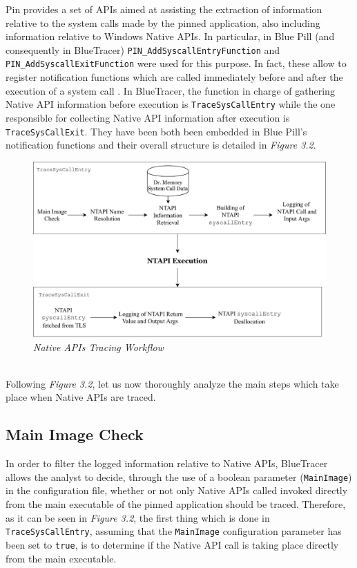 Pin provides a set of APIs aimed at assisting the extraction of information relative to the system calls made by the pinned application, also including information relative to Windows Native APIs. In particular, in Blue Pill (and consequently in BlueTracer) \texttt{PIN\_AddSyscallEntryFunction} and  \texttt{PIN\_AddSyscallExitFunction} were used for this purpose. In fact, these allow to register notification functions which are called immediately before and after the execution of a system call \cite{Pin}. In BlueTracer, the function in charge of gathering Native API information before execution is \texttt{TraceSysCallEntry} while the one responsible for collecting Native API information after execution is \texttt{TraceSysCallExit}. They have been both been embedded in Blue Pill's notification functions and their overall structure is detailed in \textit{Figure 3.2}.
\\
\begin{figure}[h]
\centering
\includegraphics[scale=0.75]{Figures/NTAPITracing.pdf}
\caption{\textit{Native APIs Tracing Workflow}}
\end{figure}
\\
Following \textit{Figure 3.2}, let us now thoroughly analyze the main steps which take place when Native APIs are traced.

\subsection{Main Image Check}
In order to filter the logged information relative to Native APIs, BlueTracer allows the analyst to decide, through the use of a boolean parameter (\texttt{MainImage}) in the configuration file, whether or not only Native APIs called invoked directly from the main executable of the pinned application should be traced. Therefore, as it can be seen in \textit{Figure 3.2}, the first thing which is done in \texttt{TraceSysCallEntry}, assuming that the \texttt{MainImage} configuration parameter has been set to \texttt{true}, is to determine if the Native API call is taking place directly from the main executable.

